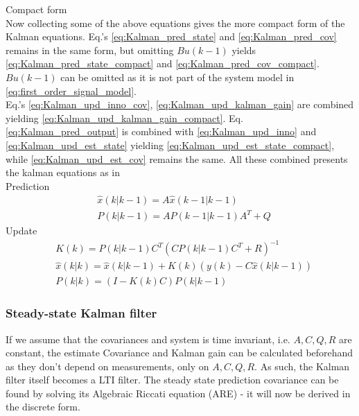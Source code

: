{Compact form}\\
Now collecting some of the above equations gives the more compact form of the Kalman equations.
Eq.'s \cref{eq:Kalman_pred_state} and \cref{eq:Kalman_pred_cov} remains in the same form, but omitting $ {Bu}(k-1) $ yields \cref{eq:Kalman_pred_state_compact} and \cref{eq:Kalman_pred_cov_compact}. $ {Bu}(k-1) $ can be omitted as it is not part of the system model in \cref{eq:first_order_signal_model}.\\
Eq.'s \cref{eq:Kalman_upd_inno_cov}, \cref{eq:Kalman_upd_kalman_gain} are combined yielding \cref{eq:Kalman_upd_kalman_gain_compact}. Eq. \cref{eq:Kalman_pred_output} is combined with \cref{eq:Kalman_upd_inno} and \cref{eq:Kalman_upd_est_state} yielding \cref{eq:Kalman_upd_est_state_compact}, while \cref{eq:Kalman_upd_est_cov} remains the same. All these combined presents the kalman equations as in \cite{Bozic1994}\\

{Prediction}
\begin{align}
	&\hat{{x}}	(k|k-1) = {A} \hat{{x}}	(k-1|k-1) 		\label{eq:Kalman_pred_state_compact} 	\\
	&{P}			(k|k-1) = {A}{P}			(k-1|k-1){A}^T+{Q} 				\label{eq:Kalman_pred_cov_compact} 		
\end{align}
{Update}
\begin{align}
	&{K}			(k) 		= {P}				(k|k-1){C}^T({C}{P}	(k|k-1)	{C}^T + {R})^{-1}										\label{eq:Kalman_upd_kalman_gain_compact} \\
	&\hat{{x}}	(k|k) 	= \hat{{x}}			(k|k-1) + {K}						(k)	({y}		(k) - {C}\hat{{x}}		(k|k-1)) 	\label{eq:Kalman_upd_est_state_compact} \\
	&{P}			(k|k) 	= ({I} - {K}	(k){C}){P}					(k|k-1)																		\label{eq:Kalman_upd_est_cov_compact}
\end{align}


\subsubsection{Steady-state Kalman filter}
If we assume that the covariances and system is time invariant, i.e. $ {A}, {C}, {Q}, {R} $ are constant, the estimate Covariance and Kalman gain can be calculated beforehand as they don't depend on measurements, only on $ {A}, {C}, {Q}, {R} $. As such, the Kalman filter itself becomes a LTI filter. The steady state prediction covariance can be found by solving its Algebraic Riccati equation (ARE) - it will now be derived in the discrete form.\\


